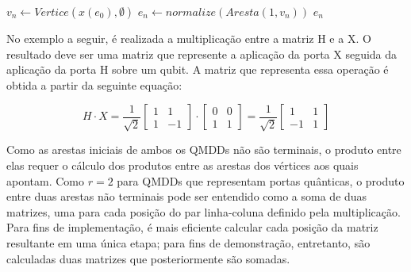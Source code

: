 \begin{algorithm}[H]
  \caption{Multiplicação de Arestas}
  \label{alg:multiplication}

  $v_n \gets Vertice(x(e_0), \emptyset)$ \;
  $e_n \gets normalize(Aresta(1, v_n))$ \;
  \Return $e_n$

\end{algorithm}

No exemplo a seguir, é realizada a multiplicação entre a matriz H e a X. O resultado deve ser uma matriz que represente a aplicação da porta X seguida da aplicação da porta H sobre um qubit. A matriz que representa essa operação é obtida a partir da seguinte equação:

\begin{equation}
  \label{eq:hx}
  H \cdot X
  =
  \frac{1}{\sqrt{2}}
  \begin{bmatrix}
    1 & 1 \\
    1 & -1
  \end{bmatrix}
  \cdot
  \begin{bmatrix}
    0 & 0 \\
    1 & 1
  \end{bmatrix}
  =
  \frac{1}{\sqrt{2}}
  \begin{bmatrix}
    1 & 1 \\
    -1 & 1
  \end{bmatrix}
\end{equation}

Como as arestas iniciais de ambos os QMDDs não são terminais, o produto entre elas requer o cálculo dos produtos entre as arestas dos vértices aos quais apontam. Como $r=2$ para QMDDs que representam portas quânticas, o produto entre duas arestas não terminais pode ser entendido como a soma de duas matrizes, uma para cada posição do par linha-coluna definido pela multiplicação. Para fins de implementação, é mais eficiente calcular cada posição da matriz resultante em uma única etapa; para fins de demonstração, entretanto, são calculadas duas matrizes que posteriormente são somadas.

